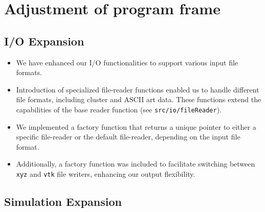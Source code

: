 \documentclass{article}
\begin{document}
\section{Adjustment of program frame}
\label{sec:adj}

\subsection{I/O Expansion}
\label{subsec:file}

\begin{itemize}
    \item We have enhanced our I/O functionalities to support various input file formats.
    \item Introduction of specialized file-reader functions enabled us to handle different file formats, including cluster and ASCII art data. These functions extend the capabilities of the base reader function (see \texttt{src/io/fileReader}).
    \item We implemented a factory function that returns a unique pointer to either a specific file-reader or the default file-reader, depending on the input file format.
    \item Additionally, a factory function was included to facilitate switching between \texttt{xyz} and \texttt{vtk} file writers, enhancing our output flexibility.
\end{itemize}

\subsection{Simulation Expansion}
\label{subsec:sim}
\end{document}
